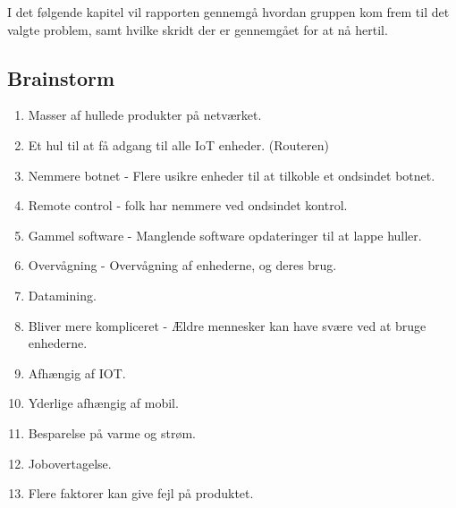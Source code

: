 I det følgende kapitel vil rapporten gennemgå hvordan gruppen kom frem til det valgte problem, samt hvilke skridt der er gennemgået for at nå hertil.

\subsection{Brainstorm}
        \begin{enumerate}
            \item Masser af hullede produkter på netværket.
            \item Et hul til at få adgang til alle IoT enheder. (Routeren)
            \item Nemmere botnet - Flere usikre enheder til at tilkoble et ondsindet botnet.
            \item Remote control - folk har nemmere ved ondsindet kontrol.
            \item Gammel software - Manglende software opdateringer til at lappe huller.
            \item Overvågning - Overvågning af enhederne, og deres brug.
            \item Datamining.
            \item Bliver mere kompliceret - Ældre mennesker kan have svære ved at bruge enhederne.
            \item Afhængig af IOT.
            \item Yderlige afhængig af mobil.
            \item Besparelse på varme og strøm.
            \item Jobovertagelse. 
            \item Flere faktorer kan give fejl på produktet.
        \end{enumerate}